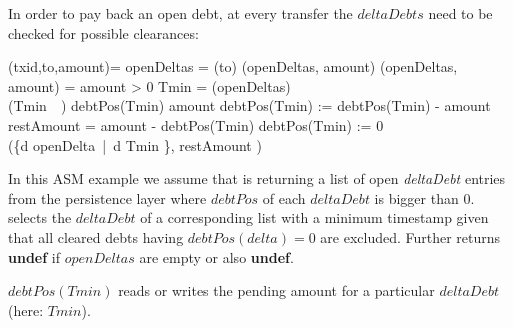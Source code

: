 In order to pay back an open debt, at every transfer the $deltaDebts$ need to be checked for possible clearances:

\begin{asm}
	(txid,to,amount)=\+
		\LET openDeltas = (to)\+
			(openDeltas, amount)\dec\-
	\WHERE \+
		(openDeltas, amount) =\+
		\IF amount > 0 \THEN\+
			\LET Tmin = (openDeltas)\\
			\IF (Tmin\ \neq\ \UNDEF) \THEN\+
				\IF debtPos(Tmin) \ge amount \THEN\+
					debtPos(Tmin) := debtPos(Tmin) - amount\-
				\ELSE\+
					\LET restAmount = amount - debtPos(Tmin)\+
						debtPos(Tmin) := 0\\
						(\{d \in openDelta\ |\ d \neq Tmin \}, restAmount )\dec\dec\dec\-
\end{asm}


In this ASM example we assume that  is returning a list of open \textit{deltaDebt} entries from the persistence layer where $debtPos$ of each $deltaDebt$ is bigger than $0$.  selects the $deltaDebt$ of a corresponding list with a minimum timestamp given that all cleared debts having $debtPos(delta)=0$ are excluded. Further  returns \textbf{undef} if $openDeltas$ are empty or also \textbf{undef}.

$debtPos(Tmin)$ reads or writes the pending amount for a particular $deltaDebt$ (here: $Tmin$).









